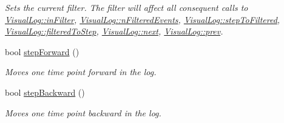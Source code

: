 \begin{DoxyCompactItemize}
\begin{DoxyCompactList}\small\item\em Sets the current filter. The filter will affect all consequent calls to \hyperlink{structslb_1_1core_1_1ui_1_1VisualLog_a2998fb13fa3b8d956e46a0b3291ec58c}{Visual\+Log\+::in\+Filter}, \hyperlink{structslb_1_1core_1_1ui_1_1VisualLog_a817b103fe9fc05de04d7ddf4b26d8076}{Visual\+Log\+::n\+Filtered\+Events}, \hyperlink{structslb_1_1core_1_1ui_1_1VisualLog_a7cc1fc6e64c5db9f3bfe78edb857ebd4}{Visual\+Log\+::step\+To\+Filtered}, \hyperlink{structslb_1_1core_1_1ui_1_1VisualLog_a3e35a401b5c69aea1511783dc5ef2fbe}{Visual\+Log\+::filtered\+To\+Step}, \hyperlink{structslb_1_1core_1_1ui_1_1VisualLog_ace600c20edb1a2fad66467118c011c0d}{Visual\+Log\+::next}, \hyperlink{structslb_1_1core_1_1ui_1_1VisualLog_a272e8d2c8bb5ff7486d4b71e84d61512}{Visual\+Log\+::prev}. \end{DoxyCompactList}\item 
bool \hyperlink{structslb_1_1core_1_1ui_1_1VisualLog_af5771020cfc2389e588efb8645c583bf}{step\+Forward} ()
\begin{DoxyCompactList}\small\item\em Moves one time point forward in the log. \end{DoxyCompactList}\item 
bool \hyperlink{structslb_1_1core_1_1ui_1_1VisualLog_adc357abbd88e3988f0da0587a294c6f6}{step\+Backward} ()
\begin{DoxyCompactList}\small\item\em Moves one time point backward in the log. \end{DoxyCompactList}\end{DoxyCompactItemize}
